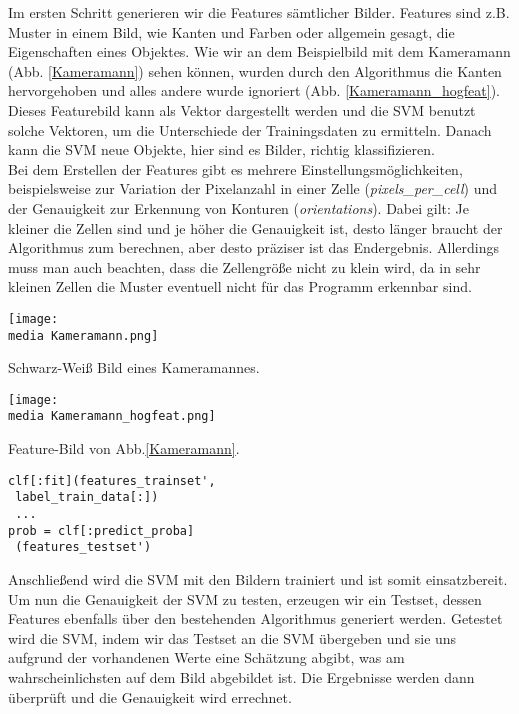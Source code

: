 Im ersten Schritt generieren wir die Features sämtlicher Bilder. Features sind z.B. Muster in einem Bild, wie Kanten und Farben oder allgemein gesagt, die Eigenschaften eines Objektes. Wie wir an dem Beispielbild mit dem Kameramann (Abb. \ref{Kameramann}) sehen können, wurden durch den Algorithmus die Kanten hervorgehoben und alles andere wurde ignoriert (Abb. \ref{Kameramann_hogfeat}). Dieses Featurebild kann als Vektor dargestellt werden und die SVM benutzt solche Vektoren, um die Unterschiede der Trainingsdaten zu ermitteln. Danach kann die SVM neue Objekte, hier sind es Bilder, richtig klassifizieren.\\ 
Bei dem Erstellen der Features gibt es mehrere Einstellungsmöglichkeiten, beispielsweise zur Variation der Pixelanzahl in einer Zelle (\textit{pixels\_per\_cell}) und der Genauigkeit zur Erkennung von Konturen (\textit{orientations}). Dabei gilt: Je kleiner die Zellen sind und je höher die Genauigkeit ist, desto länger braucht der Algorithmus zum berechnen, aber desto präziser ist das Endergebnis. Allerdings muss man auch beachten, dass die Zellengröße nicht zu klein wird, da in sehr kleinen Zellen die Muster eventuell nicht für das Programm erkennbar sind. 

\begin{dsafigure}
\begin{center}
	\texttt{[image: \\media Kameramann.png]}
	\caption{Schwarz-Weiß Bild eines Kameramannes.}
	\label{Kameramann}
\end{center}
\end{dsafigure}

\begin{dsafigure}
\begin{center}
	\texttt{[image: \\media Kameramann\_hogfeat.png]}
	\caption{Feature-Bild von Abb.\ref{Kameramann}.}
	\label{Kameramann_hogfeat}
\end{center}
\end{dsafigure}

\begin{verbatim}
clf[:fit](features_trainset', 
 label_train_data[:])
 ...
prob = clf[:predict_proba]
 (features_testset')
\end{verbatim}

Anschließend wird die SVM mit den Bildern trainiert und ist somit einsatzbereit. Um nun die Genauigkeit der SVM zu testen, erzeugen wir ein Testset, dessen Features ebenfalls über den bestehenden Algorithmus generiert werden. Getestet wird die SVM, indem wir das Testset an die SVM übergeben und sie uns aufgrund der vorhandenen Werte eine Schätzung abgibt, was am wahrscheinlichsten auf dem Bild abgebildet ist. Die Ergebnisse werden dann überprüft und die Genauigkeit wird errechnet.

